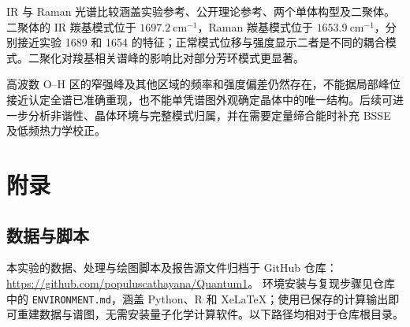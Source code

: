 \documentclass[a4paper,12pt]{article}
\begin{document}
IR 与 Raman 光谱比较涵盖实验参考、公开理论参考、两个单体构型及二聚体。二聚体的 IR 羰基模式位于 $1697.2\ \mathrm{cm^{-1}}$，Raman 羰基模式位于 $1653.9\ \mathrm{cm^{-1}}$，分别接近实验 1689 和 1654 的特征；正常模式位移与强度显示二者是不同的耦合模式。二聚化对羧基相关谱峰的影响比对部分芳环模式更显著。

高波数 O–H 区的窄强峰及其他区域的频率和强度偏差仍然存在，不能据局部峰位接近认定全谱已准确重现，也不能单凭谱图外观确定晶体中的唯一结构。后续可进一步分析非谐性、晶体环境与完整模式归属，并在需要定量缔合能时补充 BSSE 及低频热力学校正。

\section{附录}

\subsection{数据与脚本}

本实验的数据、处理与绘图脚本及报告源文件归档于 GitHub 仓库：
\url{https://github.com/populuscathayana/Quantum1}。
环境安装与复现步骤见仓库中的 \nolinkurl{ENVIRONMENT.md}，涵盖 Python、R 和 XeLaTeX；使用已保存的计算输出即可重建数据与谱图，无需安装量子化学计算软件。以下路径均相对于仓库根目录。
\end{document}
